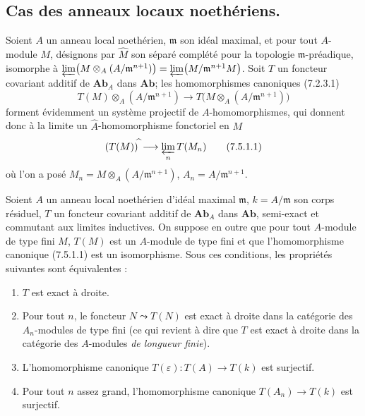 \subsection{Cas des anneaux locaux noethériens.}
\label{subsection:III.7.5.fr}

\begin{env}[7.5.1]
Soient $A$ un anneau local noethérien, $\mathfrak m$ son idéal maximal, et pour
tout $A$-module $M$, désignons par $\widehat M$ son séparé complété pour la
topologie $\mathfrak m$-préadique, isomorphe à
$\varprojlim\bigl(M\otimes_A(A/\mathfrak m^{n+1})\bigr)=\varprojlim\bigl(M/\mathfrak m^{n+1}M\bigr)$.
Soit $T$ un foncteur covariant additif de $\boldsymbol{Ab}_A$ dans $\boldsymbol{Ab}$;
les homomorphismes canoniques (7.2.3.1)
\[
  T(M)\otimes_A(A/\mathfrak m^{n+1})
  \longrightarrow
  T\bigl(M\otimes_A(A/\mathfrak m^{n+1})\bigr)
\]
forment évidemment un système projectif de $A$-homomorphismes, qui donnent donc
à la limite un $\widehat A$-homomorphisme fonctoriel en $M$
\[
  (T(M))^{\widehat{\,}}
  \longrightarrow
  \varprojlim_n T(M_n)
  \tag{7.5.1.1}\label{III.7.5.1.1.fr}
\]
où l'on a posé
$M_n=M\otimes_A(A/\mathfrak m^{n+1})$, $A_n=A/\mathfrak m^{n+1}$.
\end{env}

\begin{proposition}[7.5.2]
Soient $A$ un anneau local noethérien d'idéal maximal $\mathfrak m$,
$k=A/\mathfrak m$ son corps résiduel, $T$ un foncteur covariant additif de
$\mathbf{Ab}_A$ dans $\mathbf{Ab}$, semi-exact et commutant aux limites
inductives. On suppose en outre que pour tout $A$-module de type fini $M$,
$T(M)$ est un $A$-module de type fini et que l'homomorphisme canonique
\textup{(7.5.1.1)} est un isomorphisme. Sous ces conditions, les propriétés suivantes
sont équivalentes :
\begin{enumerate}
  \item[a)] $T$ est exact à droite.
  \item[b)] Pour tout $n$, le foncteur $N\leadsto T(N)$ est exact à droite dans
    la catégorie des $A_n$-modules de type fini \textup{(ce qui revient à dire que $T$
    est exact à droite dans la catégorie des $A$-modules \emph{de longueur finie})}.
  \item[c)] L'homomorphisme canonique
    $T(\varepsilon):T(A)\longrightarrow T(k)$
    est surjectif.
  \item[d)] Pour tout $n$ assez grand, l'homomorphisme canonique
    $T(A_n)\longrightarrow T(k)$
    est surjectif.
\end{enumerate}
\end{proposition}

